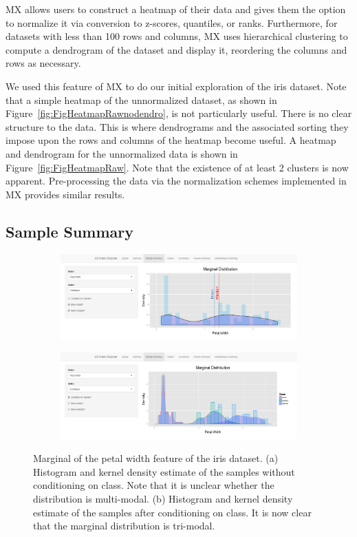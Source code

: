 \documentclass[12pt]{article}
\begin{document}
MX allows users to construct a heatmap of their data and gives them the option to normalize it via conversion to z-scores, quantiles, or ranks. Furthermore, for datasets with less than 100 rows and columns, MX uses hierarchical clustering to compute a dendrogram of the dataset and display it, reordering the columns and rows as necessary. 

We used this feature of MX to do our initial exploration of the iris dataset. Note that a simple heatmap of the unnormalized dataset, as shown in Figure~\ref{fig:FigHeatmapRawnodendro}, is not particularly useful. There is no clear structure to the data. This is where dendrograms and the associated sorting they impose upon the rows and columns of the heatmap become useful. A heatmap and dendrogram for the unnormalized data is shown in Figure~\ref{fig:FigHeatmapRaw}. Note that the existence of at least 2 clusters is now apparent. Pre-processing the data via the normalization schemes implemented in MX provides similar results. 

\subsection{Sample Summary}
\label{subsec:SubSecSample}

\begin{figure}[t!]
	\centering
	\begin{subfigure}[b]{0.8\textwidth}
		\includegraphics[width=\textwidth]{Figures/Iris/MarginalPetalWidthnocond.png}
		\subcaption{}
		\label{fig:FigMarginalNoCond}
	\end{subfigure}
	\begin{subfigure}[b]{0.8\textwidth}
		\includegraphics[width=\textwidth]{Figures/Iris/MarginalPetalWidth.png}
		\subcaption{}
		\label{fig:FigMarginal}
	\end{subfigure}
	\caption{Marginal of the petal width feature of the iris dataset. (a) Histogram and kernel density estimate of the samples without conditioning on class. Note that it is unclear whether the distribution is multi-modal. (b) Histogram and kernel density estimate of the samples after conditioning on class. It is now clear that the marginal distribution is tri-modal.}
	\label{fig:FigSample}
\end{figure}
\end{document}
